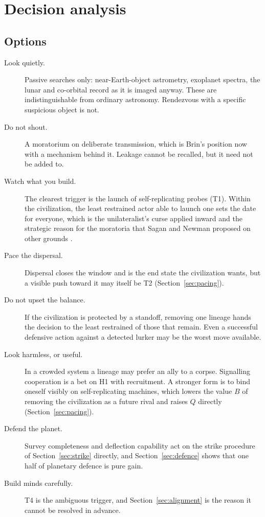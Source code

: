 \documentclass[preprint,12pt]{elsarticle}
\theoremstyle{definition}
\begin{document}
\section{Decision analysis}
\label{sec:decision}

\subsection{Options}

\begin{description}
  \item[Look quietly.] Passive searches only: near-Earth-object astrometry, exoplanet spectra, the lunar and co-orbital record as it is imaged anyway. These are indistinguishable from ordinary astronomy. Rendezvous with a specific suspicious object is not.
  \item[Do not shout.] A moratorium on deliberate transmission, which is Brin's position \citep{Brin2014} now with a mechanism behind it. Leakage cannot be recalled, but it need not be added to.
  \item[Watch what you build.] The clearest trigger is the launch of self-replicating probes (T1). Within the civilization, the least restrained actor able to launch one sets the date for everyone, which is the unilateralist's curse \citep{Bostrom2016} applied inward and the strategic reason for the moratoria that Sagan and Newman proposed on other grounds \citep{Forgan2019}.
  \item[Pace the dispersal.] Dispersal closes the window and is the end state the civilization wants, but a visible push toward it may itself be T2 (Section~\ref{sec:pacing}).
  \item[Do not upset the balance.] If the civilization is protected by a standoff, removing one lineage hands the decision to the least restrained of those that remain. Even a successful defensive action against a detected lurker may be the worst move available.
  \item[Look harmless, or useful.] In a crowded system a lineage may prefer an ally to a corpse. Signalling cooperation is a bet on H1 with recruitment. A stronger form is to bind oneself visibly on self-replicating machines, which lowers the value $B$ of removing the civilization as a future rival and raises $Q$ directly (Section~\ref{sec:pacing}).
  \item[Defend the planet.] Survey completeness and deflection capability act on the strike procedure of Section~\ref{sec:strike} directly, and Section~\ref{sec:defence} shows that one half of planetary defence is pure gain.
  \item[Build minds carefully.] T4 is the ambiguous trigger, and Section~\ref{sec:alignment} is the reason it cannot be resolved in advance.
\end{description}
\end{document}
